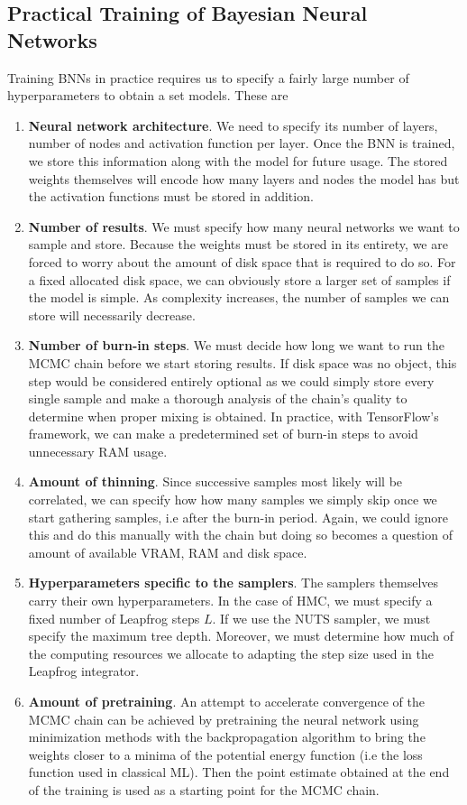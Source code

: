 \subsection{Practical Training of Bayesian Neural Networks}

Training BNNs in practice requires us to specify a fairly large number of hyperparameters to obtain a set models. These are 
\begin{enumerate}
  \item \textbf{Neural network architecture}. We need to specify its number of layers, number of nodes and activation function per layer. 
  Once the BNN is trained, we store this information along with the model for future usage. The stored weights themselves will encode how many layers and nodes the model has but the activation functions must be stored in addition.
  \item \textbf{Number of results}. We must specify how many neural networks we want to sample and store. Because the weights must be stored in its entirety, we are forced to worry about the amount of disk space that is required to do so. For a fixed allocated disk space, we can obviously store a larger set of samples if the model is simple. As complexity increases, the number of samples we can store will necessarily decrease.
  \item \textbf{Number of burn-in steps}. We must decide how long we want to run the MCMC chain before we start storing results. If disk space was no object, this step would be considered entirely optional as we could simply store every single sample and make a thorough analysis of the chain's quality to determine when proper mixing is obtained. In practice, with TensorFlow's framework, we can make a predetermined set of burn-in steps to avoid unnecessary RAM usage.
  \item \textbf{Amount of thinning}. Since successive samples most likely will be correlated, we can specify how how many samples we simply skip once we start gathering samples, i.e after the burn-in period. Again, we could ignore this and do this manually with the chain but doing so becomes a question of amount of available VRAM, RAM and disk space. 
  \item \textbf{Hyperparameters specific to the samplers}. The samplers themselves carry their own hyperparameters. In the case of HMC, we must specify a fixed number of Leapfrog steps $L$. If we use the NUTS sampler, we must specify the maximum tree depth. Moreover, we must determine how much of the computing resources we allocate to adapting the step size used in the Leapfrog integrator.
  \item \textbf{Amount of pretraining}. An attempt to accelerate convergence of the MCMC chain can be achieved by pretraining the neural network using minimization methods with the backpropagation algorithm to bring the weights closer to a minima of the potential energy function (i.e the loss function used in classical ML). Then the point estimate obtained at the end of the training is used as a starting point for the MCMC chain.
\end{enumerate}

